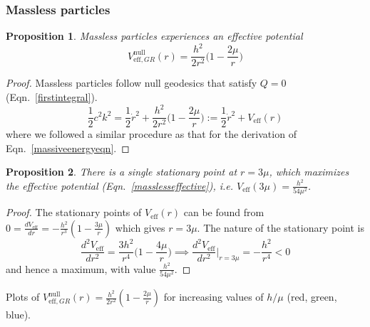 \documentclass[a4paper]{article}
\theoremstyle{new}
\newtheorem{prop}{Proposition}[section]
\begin{document}
\subsubsection{Massless particles}
\begin{prop}
Massless particles experiences an effective potential
\begin{equation}
V^{\text{null}}_{\text{eff},GR}(r)=\frac{h^2}{2r^2}\bigg(1-\frac{2\mu}{r}\bigg)\label{masslesseffective}
\end{equation}
\end{prop}
\begin{proof}
Massless particles follow null geodesics that satisfy $Q=0$ (Eqn.~\ref{firstintegral}).
\begin{equation}
\frac{1}{2}c^2k^2=\frac{1}{2}\dot{r}^2+\frac{h^2}{2r^2}\bigg(1-\frac{2\mu}{r}\bigg):=\frac{1}{2}\dot{r}^2+V_{\text{eff}}(r)\label{masslessenergyeqn}
\end{equation}
where we followed a similar procedure as that for the derivation of Eqn.~\ref{massiveenergyeqn}.
\end{proof}
\begin{prop}
There is a single stationary point at $r=3\mu$, which maximizes the effective potential (Eqn.~\ref{masslesseffective}), i.e. $V_{\text{eff}}(3\mu)=\frac{h^2}{54\mu^2}$.
\end{prop}
\begin{proof}
The stationary points of $V_{\text{eff}}(r)$ can be found from $0=\frac{dV_{\text{eff}}}{dr}=-\frac{h^2}{r^3}(1-\frac{3\mu}{r})$ which gives $r=3\mu$. The nature of the stationary point is
$$\frac{d^2V_{\text{eff}}}{dr^2}=\frac{3h^2}{r^4}\bigg(1-\frac{4\mu}{r}\bigg)\implies\frac{d^2V_{\text{eff}}}{dr^2}\bigg|_{r=3\mu}=-\frac{h^2}{r^4}<0$$
and hence a maximum, with value $\frac{h^2}{54\mu^2}$.
\end{proof}
\begin{center}
\end{center}
Plots of $V_{\text{eff},GR}^{\text{null}}(r)=\frac{h^2}{2r^2}(1-\frac{2\mu}{r})$ for increasing values of $h/\mu$ (red, green, blue).
\end{document}
